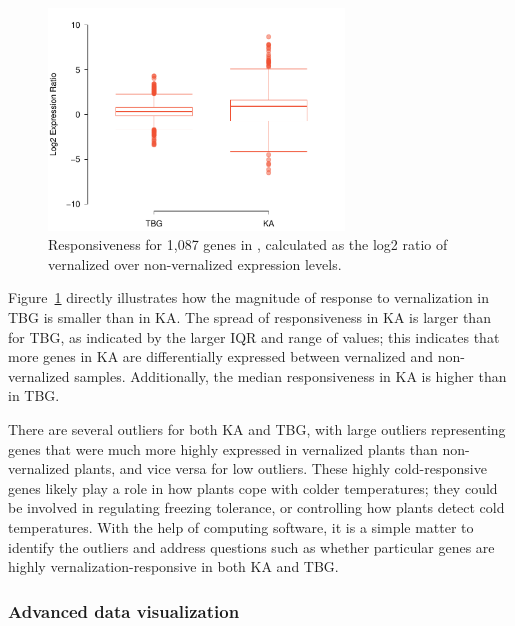 \textD{\newpage}

\begin{figure}[h]
	\centering
	\includegraphics[width=0.7\textwidth]{ch_intro_to_data_oi_biostat/figures/arenosaResponseBoxplot/arenosaResponseBoxplot}
	\caption{Responsiveness for 1,087 genes in , calculated as the log2 ratio of vernalized over non-vernalized expression levels.}
	\label{arenosaResponseBoxplot}
\end{figure}

Figure~\ref{arenosaResponseBoxplot} directly illustrates how the magnitude of response to vernalization in TBG is smaller than in KA. The spread of responsiveness in KA is larger than for TBG, as indicated by the larger IQR and range of values; this indicates that more genes in KA are differentially expressed between vernalized and non-vernalized samples. Additionally, the median responsiveness in KA is higher than in TBG.

There are several outliers for both KA and TBG, with large outliers representing genes that were much more highly expressed in vernalized plants than non-vernalized plants, and vice versa for low outliers. These highly cold-responsive genes likely play a role in how plants cope with colder temperatures; they could be involved in regulating freezing tolerance, or controlling how plants detect cold temperatures. With the help of computing software, it is a simple matter to identify the outliers and address questions such as whether particular genes are highly vernalization-responsive in both KA and TBG.


\textD{\newpage}


\subsubsection{Advanced data visualization}

